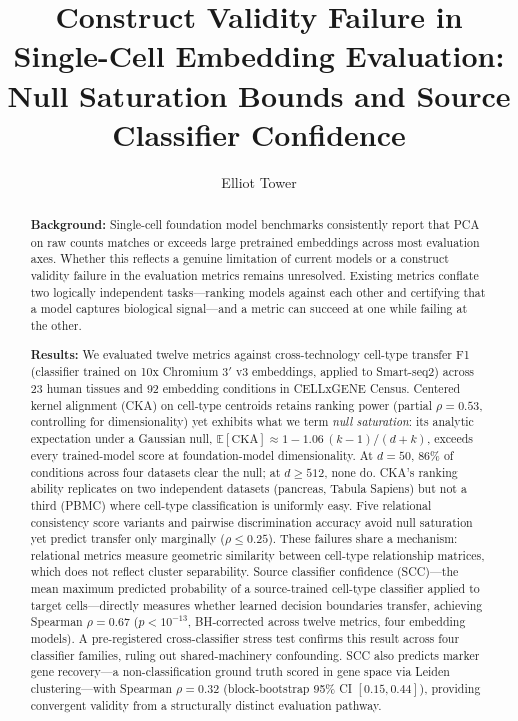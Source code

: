 \documentclass[11pt]{article}
\title{Construct Validity Failure in Single-Cell Embedding Evaluation:\\
Null Saturation Bounds and Source Classifier Confidence}
\author{Elliot Tower}
\affil{Independent researcher \\ \texttt{elliot@elliottower.ai}}
\date{}
\begin{document}
\linenumbers
\maketitle

\begin{abstract}

\textbf{Background:}
Single-cell foundation model benchmarks consistently report that PCA
on raw counts matches or exceeds large pretrained embeddings across
most evaluation axes. Whether this reflects a genuine limitation of
current models or a construct validity failure in the evaluation
metrics remains unresolved. Existing metrics conflate two logically
independent tasks---ranking models against each other and certifying
that a model captures biological signal---and a metric can succeed at
one while failing at the other.

\textbf{Results:}
We evaluated twelve metrics against cross-technology cell-type
transfer F1 (classifier trained on 10x Chromium 3$'$ v3 embeddings,
applied to Smart-seq2) across 23 human tissues and 92 embedding
conditions in CELLxGENE Census. Centered kernel alignment (CKA) on
cell-type centroids retains ranking power (partial $\rho = 0.53$,
controlling for dimensionality) yet exhibits what we term \emph{null saturation}:
its analytic expectation under a Gaussian null,
$\mathbb{E}[\mathrm{CKA}] \approx 1 - 1.06\,(k{-}1)/(d{+}k)$,
exceeds every trained-model score at foundation-model dimensionality.
At $d = 50$, 86\% of conditions across four datasets clear the null;
at $d \geq 512$, none do. CKA's ranking ability replicates on two
independent datasets (pancreas, Tabula Sapiens) but not a third
(PBMC) where cell-type classification is uniformly easy. Five
relational consistency score variants and pairwise discrimination
accuracy avoid null saturation yet predict transfer only marginally
($\rho \leq 0.25$). These failures share a mechanism: relational
metrics measure geometric similarity between cell-type relationship
matrices, which does not reflect cluster separability. Source
classifier confidence (SCC)---the mean maximum predicted probability
of a source-trained cell-type classifier applied to target
cells---directly measures whether learned decision boundaries
transfer, achieving Spearman $\rho = 0.67$ ($p < 10^{-13}$,
BH-corrected across twelve metrics, four embedding models). A
pre-registered cross-classifier stress test confirms this result
across four classifier families, ruling out shared-machinery
confounding. SCC also predicts marker gene recovery---a
non-classification ground truth scored in gene space via Leiden
clustering---with Spearman $\rho = 0.32$ (block-bootstrap 95\% CI
$[0.15, 0.44]$), providing convergent validity from a structurally
distinct evaluation pathway.


\end{abstract}
\end{document}
